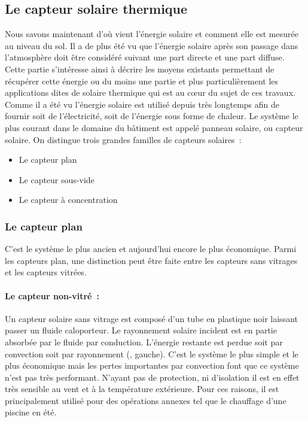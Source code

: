 \subsection{Le capteur solaire thermique} %
\label{sub:le_capteur_solaire_thermique}
Nous savons maintenant d’où vient l’énergie solaire et comment elle est mesurée
au niveau du sol. Il a de plus été vu que l’énergie solaire après son passage dans
l’atmosphère doit être considéré suivant une part directe et une part diffuse.
Cette partie s’intéresse ainsi à décrire les moyens existants permettant de récupérer
cette énergie ou du moins une partie et plus particulièrement les applications
dites de solaire thermique qui est au cœur du sujet de ces travaux. Comme il a été
vu l’énergie solaire est utilisé depuis très longtemps afin de fournir soit de l’électricité,
soit de l’énergie sous forme de chaleur.
Le système le plus courant dans le domaine du bâtiment est appelé panneau solaire, ou capteur solaire.
On distingue trois grandes familles de capteurs solaires~:
\begin{itemize}
    \item Le capteur plan
    \item Le capteur sous-vide
    \item Le capteur à concentration
\end{itemize}


\subsubsection{Le capteur plan} %
\label{ssub:le_capteur_plan}
C’est le système le plus ancien et aujourd’hui encore le plus économique. Parmi les
capteurs plan, une distinction peut être faite entre les capteurs sans vitrages
et les capteurs vitrées.

\paragraph{Le capteur non-vitré~:} %
\label{par:le_capteur_non_vitre}
Un capteur solaire sans vitrage est composé d’un tube en plastique noir laissant
passer un fluide caloporteur. Le rayonnement solaire incident est en partie absorbée
par le fluide par conduction. L’énergie restante est perdue soit par convection soit
par rayonnement (, gauche). C’est le système le plus simple
et le plus économique mais les pertes importantes par convection font que ce système
n’est pas très performant. N’ayant pas de protection, ni d’isolation il est en
effet très sensible au vent et à la température extérieure.
Pour ces raisons, il est principalement utilisé pour
des opérations annexes tel que le chauffage d’une piscine en été.

